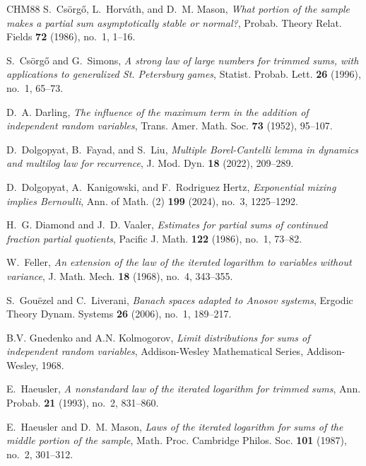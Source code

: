 \documentclass[11pt,twoside,a4paper,reqno]{amsart}
\begin{document}
\begin{thebibliography}{CHM88}
S.~Cs\"org\H{o}, L.~Horv\'ath, and D.~M. Mason, \emph{What portion of the
  sample makes a partial sum asymptotically stable or normal?}, Probab. Theory
  Relat. Fields \textbf{72} (1986), no.~1, 1--16.


S.~Cs\"{o}rg\H{o} and G.~Simons, \emph{A strong law of large numbers for trimmed sums, with applications to generalized St. Petersburg games},
Statist. Probab. Lett. {\bf 26} (1996), no.~1, 65--73.




D.~A. Darling, \emph{The influence of the maximum term in the addition of
  independent random variables}, Trans. Amer. Math. Soc. \textbf{73} (1952),
  95--107.

D.~Dolgopyat, B.~Fayad, and S.~Liu, \emph{Multiple {B}orel-{C}antelli lemma in
  dynamics and multilog law for recurrence}, J. Mod. Dyn. \textbf{18} (2022),
  209--289.



D.~Dolgopyat, A.~Kanigowski, and F.~Rodriguez Hertz, \emph{Exponential mixing implies Bernoulli}, Ann. of Math. (2) \textbf{199} (2024), no.~3, 1225--1292.



H.~G. Diamond and J.~D. Vaaler, \emph{Estimates for partial sums of continued
  fraction partial quotients}, Pacific J. Math. \textbf{122} (1986), no.~1,
  73--82.

W.~Feller, \emph{An extension of the law of the iterated logarithm to variables
  without variance}, J. Math. Mech.  \textbf{18} (1968),
  no.~4, 343--355.


S.~Gou\"{e}zel and C.~Liverani, \emph{Banach spaces adapted to {A}nosov
  systems}, Ergodic Theory Dynam. Systems \textbf{26} (2006), no.~1, 189--217.


B.V. Gnedenko and A.N. Kolmogorov, \emph{Limit distributions for sums of
  independent random variables}, Addison-Wesley Mathematical Series,
  Addison-Wesley, 1968.





E.~Haeusler, \emph{A nonstandard law of the iterated logarithm for trimmed sums}, Ann. Probab. \textbf{21} (1993), no.~2, 831--860.


E.~Haeusler and D.~M. Mason, \emph{Laws of the iterated logarithm for sums of
  the middle portion of the sample}, Math. Proc. Cambridge Philos. Soc.
  \textbf{101} (1987), no.~2, 301--312.


\end{thebibliography}
\end{document}
